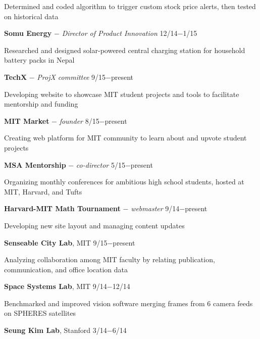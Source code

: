 \documentclass[11pt]{article}
\newcommand{\msection}[1]{\vspace{1em}\marginnote{#1}} %
\newcommand{\bt}[1]{\textbf{#1}} %
\newcommand{\gap}[0]{\vspace{0.5em}} %
\newcommand{\dash}[0]{ $-$ } %
\begin{document}
Determined and coded algorithm to trigger custom stock price alerts, then tested on historical data



\gap

\bt{Somu Energy}\dash \emph{Director of Product Innovation} \hfill 12/14$-$1/15

Researched and designed solar-powered central charging station for household battery packs in Nepal





\msection{Leadership}
\bt{TechX}\dash \emph{ProjX committee} \hfill 9/15$-$present

Developing website to showcase MIT student projects and tools to facilitate mentorship and funding

\gap

\bt{MIT Market}\dash \emph{founder} \hfill 8/15$-$present

Creating web platform for MIT community to learn about and upvote student projects

\gap

\bt{MSA Mentorship}\dash \emph{co-director} \hfill 5/15$-$present

Organizing monthly conferences for ambitious high school students, hosted at MIT, Harvard, and Tufts

\gap

\bt{Harvard-MIT Math Tournament}\dash \emph{webmaster} \hfill 9/14$-$present

Developing new site layout and managing content updates


\msection{Research}

\bt{Senseable City Lab}, MIT \hfill 9/15$-$present

Analyzing collaboration among MIT faculty by relating publication, communication, and office location data

\gap

\bt{Space Systems Lab}, MIT \hfill 9/14$-$12/14

Benchmarked and improved vision software merging frames from 6 camera feeds on SPHERES satellites

\gap

\bt{Seung Kim Lab}, Stanford \hfill 3/14$-$6/14
\end{document}
